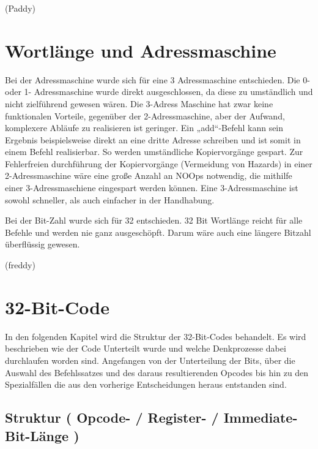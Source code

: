 \documentclass[paper=a4,fontsize=12pt,twocolumn]{scrreprt}
\begin{document}
(Paddy)

\section{Wortlänge und Adressmaschine}


Bei der Adressmaschine wurde sich für eine 3 Adressmaschine entschieden.
Die 0- oder 1- Adressmaschine wurde direkt ausgeschlossen, da diese zu umständlich und nicht zielführend gewesen wären.
Die 3-Adress Maschine hat zwar keine funktionalen Vorteile, gegenüber der 2-Adressmaschine, aber der Aufwand, komplexere Abläufe zu realisieren ist geringer.
Ein „add“-Befehl kann sein Ergebnis beispielsweise direkt an eine dritte Adresse schreiben und ist somit in einem Befehl realisierbar.
So werden umständliche Kopiervorgänge gespart.
Zur Fehlerfreien durchführung der Kopiervorgänge (Vermeidung von Hazards) in einer 2-Adressmaschine wäre eine große Anzahl an NOOps notwendig, die mithilfe einer 3-Adressmaschiene eingespart werden können.
Eine 3-Adressmaschine ist sowohl schneller, als auch einfacher in der Handhabung.

Bei der Bit-Zahl wurde sich für 32 entschieden.
32 Bit Wortlänge reicht für alle Befehle und werden nie ganz ausgeschöpft.
Darum wäre auch eine längere Bitzahl überflüssig gewesen.


(freddy)

\section{32-Bit-Code}

In den folgenden Kapitel wird die Struktur der 32-Bit-Codes behandelt.
Es wird beschrieben wie der Code Unterteilt wurde und welche Denkprozesse dabei durchlaufen worden sind.
Angefangen von der Unterteilung der Bits, über die Auswahl des Befehlssatzes und des daraus resultierenden Opcodes bis hin zu den Spezialfällen die aus den vorherige Entscheidungen heraus entstanden sind.

\subsection{Struktur ( Opcode- / Register- / Immediate- Bit-Länge )}
\end{document}
